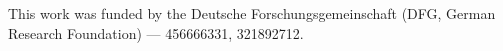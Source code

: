 This work was funded by the Deutsche Forschungsgemeinschaft (DFG, German Research Foundation) — 456666331, 321892712.